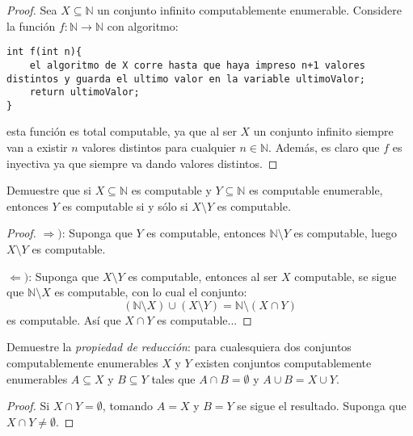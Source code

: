 \documentclass[12pt]{report}
\newcounter{it}
\theoremstyle{largebreak}
\newcommand\cf[3]{\ensuremath{#1:#2\rightarrow#3}}
\begin{document}
    \begin{proof}
        Sea $X\subseteq\mathbb{N}$ un conjunto infinito computablemente enumerable. Considere la función $\cf{f}{\mathbb{N}}{\mathbb{N}}$ con algoritmo:
        \begin{lstlisting}
int f(int n){
    el algoritmo de X corre hasta que haya impreso n+1 valores distintos y guarda el ultimo valor en la variable ultimoValor;
    return ultimoValor;
}
        \end{lstlisting}
        esta función es total computable, ya que al ser $X$ un conjunto infinito siempre van a existir $n$ valores distintos para cualquier $n\in\mathbb{N}$. Además, es claro que $f$ es inyectiva ya que siempre va dando valores distintos.
    \end{proof}
        
    \begin{excer}
        Demuestre que si $X\subseteq\mathbb{N}$ es computable y $Y\subseteq\mathbb{N}$ es computable enumerable, entonces $Y$ es computable si y sólo si $X\setminus Y$ es computable.
    \end{excer}

    \begin{proof}
        $\Rightarrow)$: Suponga que $Y$ es computable, entonces $\mathbb{N}\setminus Y$ es computable, luego $X\setminus Y$ es computable.

        $\Leftarrow)$: Suponga que $X\setminus Y$ es computable, entonces al ser $X$ computable, se sigue que $\mathbb{N}\setminus X$ es computable, con lo cual el conjunto:
        \begin{equation*}
            (\mathbb{N}\setminus X)\cup (X\setminus Y)=\mathbb{N}\setminus (X\cap Y)
        \end{equation*}
        es computable. Así que $X\cap Y$ es computable...
    \end{proof}

    \begin{excer}
        Demuestre la \textit{propiedad de reducción}: para cualesquiera dos conjuntos computablemente enumerables $X$ y $Y$ existen conjuntos computablemente enumerables $A\subseteq X$ y $B\subseteq Y$ tales que $A\cap B=\emptyset$ y $A\cup B=X\cup Y$. 
    \end{excer}

    \begin{proof}
        Si $X\cap Y=\emptyset$, tomando $A=X$ y $B=Y$ se sigue el resultado. Suponga que $X\cap Y\neq\emptyset$.
    \end{proof}
\end{document}
